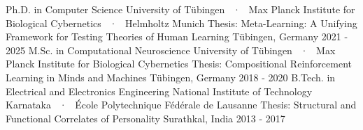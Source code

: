 \begin{cventries}
\vspace{-12mm}
  \cventryEd
    {} %
    {} %
    {}
    {} %
    {} %
    {}
 \cventryLab
    {Ph.D. in Computer Science} %
    {University of Tübingen ~·~ Max Planck Institute for Biological Cybernetics  ~·~ Helmholtz Munich} %
    {Thesis: Meta-Learning: A Unifying Framework for Testing Theories of Human Learning} %
    {Tübingen, Germany} %
    {2021 - 2025} %
    {}
\cventryLab
    {M.Sc. in Computational Neuroscience} %
    {University of Tübingen ~·~ Max Planck Institute for Biological Cybernetics} %
    {Thesis: Compositional Reinforcement Learning in Minds and Machines}
    {Tübingen, Germany} %
    {2018 - 2020} %
    {}
\cventryLab
    {B.Tech.  in Electrical and Electronics Engineering} %
    {National Institute of Technology Karnataka ~·~ École Polytechnique Fédérale de Lausanne} %
    {Thesis: Structural and Functional Correlates of Personality}
    {Surathkal, India} %
    {2013 - 2017} %
    {}
\vspace{3mm}
\end{cventries}